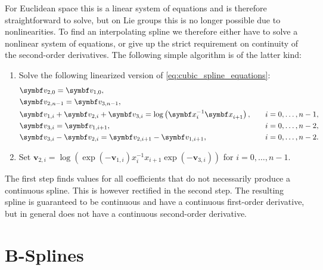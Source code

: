 For Euclidean space this is a linear system of equations and is therefore straightforward to solve, but on Lie groups this is no longer possible due to nonlinearities. To find an interpolating spline we therefore either have to solve a nonlinear system of equations, or give up the strict requirement on continuity of the second-order derivatives. The following simple algorithm is of the latter kind:
\begin{enumerate}
  \item Solve the following linearized version of \eqref{eq:cubic_spline_equations}:
        \begin{equation}
          \label{eq:cubic_spline_equations_linearized}
          \begin{aligned}
             & \symbf v_{2, 0} = \symbf v_{1, 0},                                                                               \\
             & \symbf v_{2, n-1} = \symbf v_{3, n-1},                                                                           \\
             & \symbf v_{1, i} + \symbf v_{2, i} + \symbf v_{3, i} = \log\left(\x_{i}^{-1} \x_{i+1} \right), & \quad i = 0, \ldots, n-1, \\
             & \symbf v_{3, i} = \symbf v_{1, i+1},                                                 & \quad i = 0, \ldots, n-2, \\
             & \symbf v_{3, i} - \symbf v_{2, i} = \symbf v_{2, i+1} - \symbf v_{1, i+1},           & \quad i = 0, \ldots, n-2. \\
          \end{aligned}
        \end{equation}
  \item Set $\symbf v_{2, i} = \log \left( \exp(-\symbf v_{1, i}) x_{i}^{-1} x_{i+1} \exp(-\symbf v_{3, i}) \right )$ for $i = 0, \ldots, n-1$.
\end{enumerate}
The first step finds values for all coefficients that do not necessarily produce a continuous spline. This is however rectified in the second step. The resulting spline is guaranteed to be continuous and have a continuous first-order derivative, but in general does not have a continuous second-order derivative.

\section{B-Splines}

